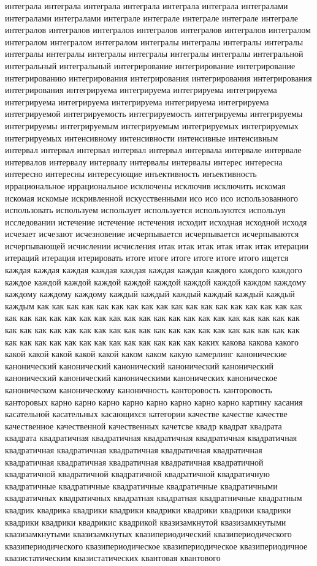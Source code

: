 интеграла интеграла интеграла интеграла интеграла интеграла интегралами интегралами интегралами интеграле интеграле интеграле интеграле интеграле интегралов интегралов интегралов интегралов интегралов интегралов интегралом интегралом интегралом интегралом интегралы интегралы интегралы интегралы интегралы интегралы интегралы интегралы интегралы интегралы интегральной интегральный интегральный интегрирование интегрирование интегрирование интегрированию интегрирования интегрирования интегрирования интегрирования интегрирования интегрируема интегрируема интегрируема интегрируема интегрируема интегрируема интегрируема интегрируема интегрируема интегрируемой интегрируемость интегрируемость интегрируемы интегрируемы интегрируемы интегрируемым интегрируемым интегрируемых интегрируемых интегрируемых интенсивному интенсивности интенсивные интенсивным интервал интервал интервал интервал интервал интервала интервале интервале интервалов интервалу интервалу интервалы интервалы интерес интересна интересно интересны интересующие инъективность инъективность иррациональное иррациональное исключены исключив исключить искомая искомая искомые искривленной искусственными исо исо исо использованного использовать используем использует используется используются используя исследовании истечение истечение истечения исходит исходная исходной исходя исчезает исчезают исчезновение исчерпывается исчерпывается исчерпываются исчерпывающей исчислении исчисления итак итак итак итак итак итак итерации итераций итерация итерировать итоге итоге итоге итоге итоге итого ищется каждая каждая каждая каждая каждая каждая каждая каждого каждого каждого каждое каждой каждой каждой каждой каждой каждой каждой каждом каждому каждому каждому каждому каждый каждый каждый каждый каждый каждый каждым как как как как как как как как как как как как как как как как как как как как как как как как как как как как как как как как как как как как как как как как как как как как как как как как как как как как как как как как как как как как как как как как как как как как как как как каких какова какова какого какой какой какой какой какой каком каком какую камерлинг канонические канонический канонический канонический канонический канонический канонический канонический каноническими канонических каноническое каноническом каноническому каноничность канторовость канторовость канторовых карно карно карно карно карно карно карно карно картину касания касательной касательных касающихся категории качестве качестве качестве качественное качественной качественных качетсве квадр квадрат квадрата квадрата квадратичная квадратичная квадратичная квадратичная квадратичная квадратичная квадратичная квадратичная квадратичная квадратичная квадратичная квадратичная квадратичная квадратичная квадратичной квадратичной квадратичной квадратичной квадратичной квадратичную квадратичные квадратичные квадратичные квадратичные квадратичными квадратичных квадратичных квадратная квадратная квадратничные квадратным квадрик квадрика квадрики квадрики квадрики квадрики квадрики квадрики квадрики квадрики квадрикис квадрикой квазизамкнутой квазизамкнутыми квазизамкнутыми квазизамкнутых квазипериодический квазипериодического квазипериодического квазипериодическое квазипериодическое квазипериодичное квазистатическим квазистатических квантовая квантового 